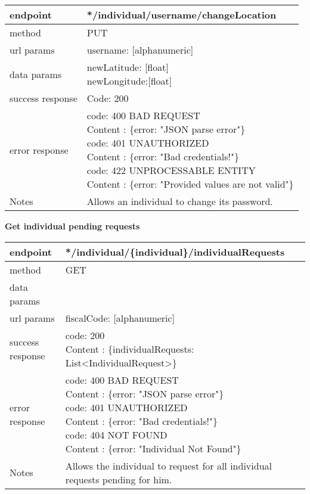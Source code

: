 \begin{tabularx}{\linewidth}{| l| l }
	\hline
	endpoint & */individual/{username}/changeLocation \\
	\hline
	method & PUT \\
	\hline
	url params & 
	\parbox{0.7\textwidth}{
		\bigskip
		username: [alphanumeric]
		\bigskip
	}\\
	\hline
	data params & 
	\parbox{0.7\textwidth}{
		\bigskip
		newLatitude: [float]\\
		newLongitude:[float]
		\bigskip
	} \\
	\hline
	success response &
	\parbox{0.7\textwidth}{
		\bigskip
		Code: 200
		\bigskip
	} \\
	\hline
	error response &
	\parbox{0.7\textwidth}{
		\bigskip
		code: 400 BAD REQUEST \\
		Content : \{error: "JSON parse error"\}\\
		code: 401 UNAUTHORIZED \\
		Content : \{error: "Bad credentials!"\}\\
		code: 422 UNPROCESSABLE ENTITY\\
		Content : \{error: "Provided values are not valid"\}
		\bigskip
	} \\
	\hline
	Notes & \parbox{0.7\textwidth}{
		\bigskip
		Allows an individual to change its password.
		\bigskip
	} \\
	\hline
\end{tabularx}

\textbf{Get individual pending requests} \\

	\begin{tabularx}{\linewidth}{| l| l }
		\hline
		endpoint & */individual/\{individual\}/individualRequests \\
		\hline
		method & GET \\
		\hline
		data params & \\
		\hline
		url params &
		\parbox{0.7\textwidth}{
			\bigskip
			fiscalCode: [alphanumeric]
			\bigskip
		} \\
		\hline
		success response &
		\parbox{0.7\textwidth}{
			\bigskip
			code: 200\\
			Content : \{individualRequests: List<IndividualRequest>\}
			\bigskip
		} \\
		\hline
		error response &
		\parbox{0.7\textwidth}{
			\bigskip
			code: 400 BAD REQUEST \\
			Content : \{error: "JSON parse error"\}\\
			code: 401 UNAUTHORIZED \\
			Content : \{error: "Bad credentials!"\}\\
			code: 404 NOT FOUND \\
			Content : \{error: "Individual Not Found"\}
			\bigskip
		} \\
		\hline
		Notes & 
		\parbox{0.7\textwidth}{
			\bigskip Allows the individual to request for all individual requests pending for him.
		\bigskip}  \\
		\hline
	\end{tabularx}
	
